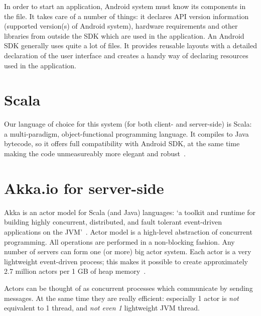 In order to start an application, Android system must know its components in the  file. It takes care of a number of things: it declares API version information (supported version(s) of Android system), hardware requirements and other libraries from outside the SDK which are used in the application. An Android SDK generally uses quite a lot of  files. It provides reusable layouts with a detailed declaration of the user interface and creates a handy way of declaring resources used in the application.

\section{Scala}
\label{sec:scala}

Our language of choice for this system (for both client- and server-side) is Scala: a multi-paradigm, object-functional programming language. It compiles to Java bytecode, so it offers full compatibility with Android SDK, at the same time making the code unmeasureably more elegant and robust~\cite{Odersky:2008:Programming}.

\section{Akka.io for server-side}
\label{sec:akka}

Akka is an actor model for Scala (and Java) languages: `a toolkit and runtime for building highly concurrent, distributed, and fault tolerant event-driven applications on the JVM'~\cite{Akka:2013:Docs}. Actor model is a high-level abstraction of concurrent programming. All operations are performed in a non-blocking fashion. Any number of servers can form one (or more) big actor system. Each actor is a very lightweight event-driven process; this makes it possible to create approximately 2.7 million actors per 1 GB of heap memory~\cite{Akka:2013:Docs}.

Actors can be thought of as concurrent processes which communicate by sending messages. At the same time they are really efficient: especially 1 actor is \emph{not} equivalent to 1 thread, and \emph{not even 1} lightweight JVM thread.
